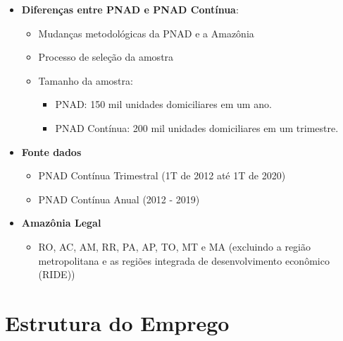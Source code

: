 \documentclass[11pt]{beamer}
\begin{document}
\begin{frame}{}

\begin{itemize}
	\item{\textbf{Diferenças entre PNAD e PNAD Contínua}:		
		\begin{itemize}
			\item{{\footnotesize Mudanças metodológicas da PNAD e a Amazônia}}
			\item{{\footnotesize Processo de seleção da amostra}}
			\item{{\footnotesize Tamanho da amostra:}
				\begin{itemize}
				 	\item{{\scriptsize PNAD: 150 mil unidades domiciliares em um ano.}}
				 	\item{{\scriptsize PNAD Contínua: 200 mil unidades domiciliares em um trimestre.}}
				\end{itemize}
			}
		\end{itemize}					
		}
		\vspace{2mm}
	\item{\textbf{Fonte dados}
			\begin{itemize}
			\item{{\footnotesize PNAD Contínua Trimestral (1T de 2012 até 1T de 2020)}}
			\item{{\footnotesize PNAD Contínua Anual (2012 - 2019)}}
			\end{itemize}					
		}	
		\vspace{2mm}
	\item{\textbf{Amazônia Legal}
			\begin{itemize}
			\item{{\footnotesize RO, AC, AM, RR, PA, AP, TO, MT e MA (excluindo a região metropolitana e as regiões integrada de desenvolvimento econômico (RIDE))}}
			\end{itemize}					
		}
\end{itemize}

\end{frame}


\section{Estrutura do Emprego}
\end{document}
